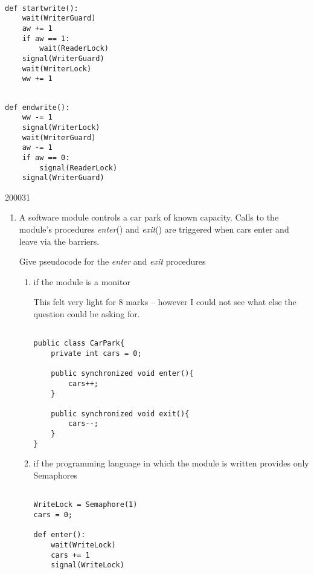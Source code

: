 \documentclass[10pt,\jkfside,a4paper]{article}
\begin{document}
\begin{lstlisting}

def startwrite():
	wait(WriterGuard)
	aw += 1
	if aw == 1:
		wait(ReaderLock)
	signal(WriterGuard)
	wait(WriterLock)
	ww += 1

\end{lstlisting}

\begin{lstlisting}

def endwrite():
	ww -= 1
	signal(WriterLock)
	wait(WriterGuard)
	aw -= 1
	if aw == 0:
		signal(ReaderLock)
	signal(WriterGuard)

\end{lstlisting}

\begin{examquestion}{2000}{3}{1}

\begin{enumerate}[label=(\alph*)]

\item A software module controls a car park of known capacity. Calls to the
module's procedures \textit{enter}() and \textit{exit}() are triggered when
cars enter and leave via the barriers.

Give pseudocode for the \textit{enter} and \textit{exit} procedures

\begin{enumerate}[label=(\roman*)]

\item if the module is a monitor

This felt very light for 8 marks -- however I could not see what else the
question could be asking for.

\begin{lstlisting}

public class CarPark{
	private int cars = 0;

	public synchronized void enter(){
		cars++;
	}

	public synchronized void exit(){
		cars--;
	}
}

\end{lstlisting}

\item if the programming language in which the module is written provides
only Semaphores

\begin{lstlisting}

WriteLock = Semaphore(1)
cars = 0;

def enter():
	wait(WriteLock)
	cars += 1
	signal(WriteLock)


\end{lstlisting}
\end{enumerate}
\end{enumerate}
\end{examquestion}
\end{document}
